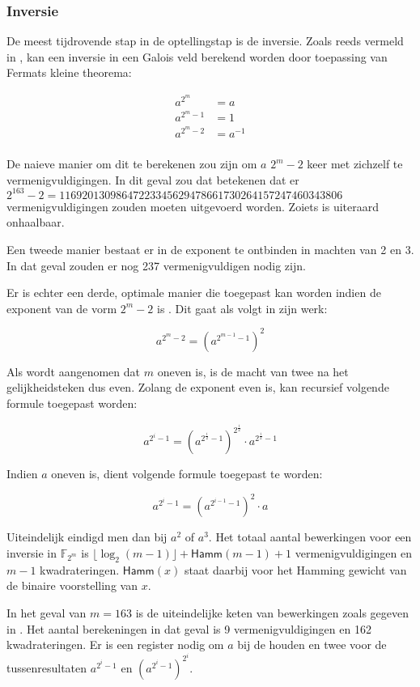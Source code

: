 \subsubsection{Inversie}

De meest tijdrovende stap in de optellingstap is de inversie.  Zoals reeds vermeld in , kan een inversie in een Galois veld berekend worden door toepassing van Fermats kleine theorema:

\[\begin{aligned}
a^{2^m}		&= a\\
a^{2^m - 1}	&= 1\\
a^{2^m - 2}	&= a^{-1}\\
\end{aligned}\]

De naieve manier om dit te berekenen zou zijn om $a$ $2^m - 2$ keer met zichzelf te vermenigvuldigingen. In dit geval zou dat betekenen dat er $2^{163} -2 = 11 692 013 098 647 223 345 629 478 661 730 264 157 247 460 343 806$ vermenigvuldigingen zouden moeten uitgevoerd worden. Zoiets is uiteraard onhaalbaar.

Een tweede manier bestaat er in de exponent te ontbinden in machten van 2 en 3. In dat geval zouden er nog 237 vermenigvuldigen nodig zijn.

Er is echter een derde, optimale manier die toegepast kan worden indien de exponent van de vorm $2^m - 2$ is \cite{batina-pkc}\cite{itoh}. Dit gaat als volgt in zijn werk:

\[a^{2^m - 2} = (a^{2^{m - 1} - 1})^2\]

Als wordt aangenomen dat $m$ oneven is, is de macht van twee na het gelijkheidsteken dus even. Zolang de exponent even is, kan recursief volgende formule toegepast worden:

\[a^{2^i - 1} = (a^{2^{\frac{i}{2}} - 1})^{2^{\frac{i}{2}}} \cdot a^{2^{\frac{i}{2}} - 1}\]

Indien $a$ oneven is, dient volgende formule toegepast te worden:

\[a^{2^i - 1} = (a^{2^{i - 1} - 1})^2 \cdot a\]

Uiteindelijk eindigd men dan bij $a^2$ of $a^3$. Het totaal aantal bewerkingen voor een inversie in $\mathbb{F}_{2^m}$ is $\lfloor\log_2(m - 1)\rfloor + \textsf{Hamm}(m - 1) + 1$ vermenigvuldigingen en $m - 1$ kwadrateringen. $\textsf{Hamm}(x)$ staat daarbij voor het Hamming gewicht van de binaire voorstelling van $x$.

In het geval van $m = 163$ is de uiteindelijke keten van bewerkingen zoals gegeven in . Het aantal berekeningen in dat geval is 9 vermenigvuldigingen en 162 kwadrateringen. Er is een register nodig om $a$ bij de houden en twee voor de tussenresultaten $a^{2^i - 1}$ en $(a^{2^i - 1})^{2^i}$.

